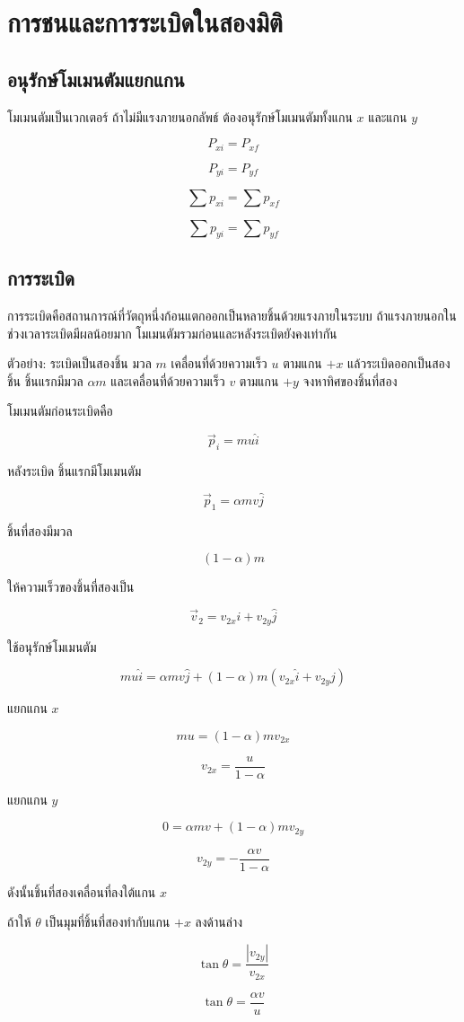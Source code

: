\section{การชนและการระเบิดในสองมิติ}

\subsection{อนุรักษ์โมเมนตัมแยกแกน}

โมเมนตัมเป็นเวกเตอร์ ถ้าไม่มีแรงภายนอกลัพธ์ ต้องอนุรักษ์โมเมนตัมทั้งแกน $x$ และแกน $y$

\[
P_{xi}=P_{xf}
\]

\[
P_{yi}=P_{yf}
\]

\begin{tcolorbox}[title=การอนุรักษ์โมเมนตัมในสองมิติ]
\[
\sum p_{xi}=\sum p_{xf}
\]

\[
\sum p_{yi}=\sum p_{yf}
\]
\end{tcolorbox}

\subsection{การระเบิด}

การระเบิดคือสถานการณ์ที่วัตถุหนึ่งก้อนแตกออกเป็นหลายชิ้นด้วยแรงภายในระบบ ถ้าแรงภายนอกในช่วงเวลาระเบิดมีผลน้อยมาก โมเมนตัมรวมก่อนและหลังระเบิดยังคงเท่ากัน

\begin{examplebox}{ตัวอย่าง: ระเบิดเป็นสองชิ้น}
มวล $m$ เคลื่อนที่ด้วยความเร็ว $u$ ตามแกน $+x$ แล้วระเบิดออกเป็นสองชิ้น ชิ้นแรกมีมวล $\alpha m$ และเคลื่อนที่ด้วยความเร็ว $v$ ตามแกน $+y$ จงหาทิศของชิ้นที่สอง

โมเมนตัมก่อนระเบิดคือ

\[
\vec{p}_i=mu\hat{i}
\]

หลังระเบิด ชิ้นแรกมีโมเมนตัม

\[
\vec{p}_1=\alpha mv\hat{j}
\]

ชิ้นที่สองมีมวล

\[
(1-\alpha)m
\]

ให้ความเร็วของชิ้นที่สองเป็น

\[
\vec{v}_2=v_{2x}\hat{i}+v_{2y}\hat{j}
\]

ใช้อนุรักษ์โมเมนตัม

\[
mu\hat{i}
=
\alpha mv\hat{j}
+
(1-\alpha)m(v_{2x}\hat{i}+v_{2y}\hat{j})
\]

แยกแกน $x$

\[
mu=(1-\alpha)mv_{2x}
\]

\[
v_{2x}=\frac{u}{1-\alpha}
\]

แยกแกน $y$

\[
0=\alpha mv+(1-\alpha)mv_{2y}
\]

\[
v_{2y}=-\frac{\alpha v}{1-\alpha}
\]

ดังนั้นชิ้นที่สองเคลื่อนที่ลงใต้แกน $x$

ถ้าให้ $\theta$ เป็นมุมที่ชิ้นที่สองทำกับแกน $+x$ ลงด้านล่าง

\[
\tan\theta=\frac{|v_{2y}|}{v_{2x}}
\]

\[
\boxed{\tan\theta=\frac{\alpha v}{u}}
\]
\end{examplebox}

